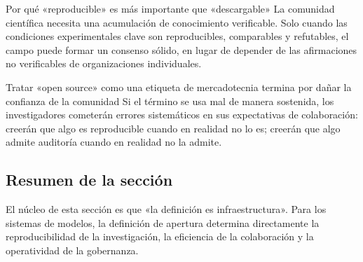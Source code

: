 \begin{knowledgebox}{Por qué «reproducible» es más importante que «descargable»}
La comunidad científica necesita una acumulación de conocimiento verificable. Solo cuando las condiciones experimentales clave son reproducibles, comparables y refutables, el campo puede formar un consenso sólido, en lugar de depender de las afirmaciones no verificables de organizaciones individuales.
\end{knowledgebox}

\begin{warningbox}{Tratar «open source» como una etiqueta de mercadotecnia termina por dañar la confianza de la comunidad}
Si el término se usa mal de manera sostenida, los investigadores cometerán errores sistemáticos en sus expectativas de colaboración:  
creerán que algo es reproducible cuando en realidad no lo es; creerán que algo admite auditoría cuando en realidad no la admite.
\end{warningbox}

\subsection{Resumen de la sección}
El núcleo de esta sección es que «la definición es infraestructura». Para los sistemas de modelos, la definición de apertura determina directamente la reproducibilidad de la investigación, la eficiencia de la colaboración y la operatividad de la gobernanza.


